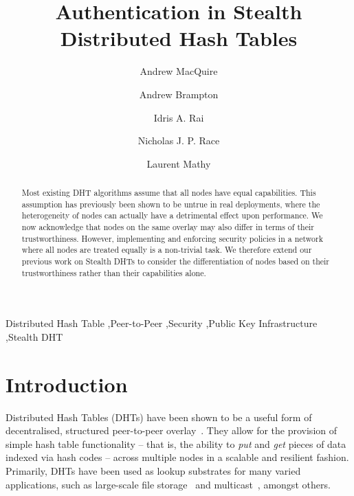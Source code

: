 \documentclass{elsart3p}
\begin{document}
\begin{frontmatter}

\title{Authentication in Stealth Distributed Hash Tables}

\newcommand{\authorpad}[1]{\hspace{1.75em}\author{#1}\hspace{1.75em}}
\authorpad{Andrew MacQuire}
\authorpad{Andrew Brampton}
\authorpad{Idris A. Rai}
\authorpad{Nicholas J. P. Race}
\authorpad{Laurent Mathy}

\address{
Computing Department\\
Lancaster University\\
\{macquire,brampton,rai,race,laurent\}@comp.lancs.ac.uk}

\begin{abstract}
Most existing DHT algorithms assume that all nodes have equal
capabilities. This assumption has previously been shown to be untrue
in real deployments, where the heterogeneity of nodes can actually
have a detrimental effect upon performance. We now acknowledge that
nodes on the same overlay may also differ in terms of their
trustworthiness. However, implementing and enforcing security
policies in a network where all nodes are treated equally is a
non-trivial task. We therefore extend our previous work on Stealth
DHTs to consider the differentiation of nodes based on their
trustworthiness rather than their capabilities alone.
\end{abstract}

\begin{keyword}
Distributed Hash Table \sep Peer-to-Peer \sep Security \sep Public
Key Infrastructure \sep Stealth DHT
\end{keyword}
\end{frontmatter}

\section{Introduction}
\label{sect-intro}

Distributed Hash Tables (DHTs) have been shown to be a useful form
of decentralised, structured peer-to-peer
overlay~\cite{Rowstron01Pastry,Stoica01Chord,Zhao01Tapestry,Ratnasamy01Scalable,Maymounkov02Kademlia}.
They allow for the provision of simple hash table functionality --
that is, the ability to \emph{put} and \emph{get} pieces of data
indexed via hash codes -- across multiple nodes in a scalable and
resilient fashion. Primarily, DHTs have been used as lookup
substrates for many varied applications, such as large-scale file
storage~\cite{Druschel01PAST,Dabek01Wide,Kubiatowicz00OceanStore}
and multicast~\cite{Rowstron01SCRIBE,Zhuang01Bayeux}, amongst
others.
\end{document}
